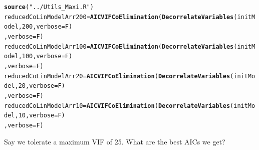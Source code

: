 \documentclass[a4paper]{article}\usepackage[]{graphicx}\usepackage[]{color}
\makeatletter
\newcommand{\hlnum}[1]{\textcolor[rgb]{0.686,0.059,0.569}{#1}}%
\newcommand{\hlstr}[1]{\textcolor[rgb]{0.192,0.494,0.8}{#1}}%
\newcommand{\hlstd}[1]{\textcolor[rgb]{0.345,0.345,0.345}{#1}}%
\newcommand{\hlkwb}[1]{\textcolor[rgb]{0.69,0.353,0.396}{#1}}%
\newcommand{\hlkwc}[1]{\textcolor[rgb]{0.333,0.667,0.333}{#1}}%
\newcommand{\hlkwd}[1]{\textcolor[rgb]{0.737,0.353,0.396}{\textbf{#1}}}%
\newenvironment{kframe}{%
 \def\at@end@of@kframe{}%
 \ifinner\ifhmode%
  \def\at@end@of@kframe{\end{minipage}}%
  \begin{minipage}{\columnwidth}%
 \fi\fi%
 \def\FrameCommand##1{\hskip\@totalleftmargin \hskip-\fboxsep
 \colorbox{shadecolor}{##1}\hskip-\fboxsep
     \hskip-\linewidth \hskip-\@totalleftmargin \hskip\columnwidth}%
 \MakeFramed {\advance\hsize-\width
   \@totalleftmargin\z@ \linewidth\hsize
   \@setminipage}}%
 {\par\unskip\endMakeFramed%
 \at@end@of@kframe}
\newenvironment{knitrout}{}{} %
\makeatother
\begin{document}
\begin{knitrout}
\color{fgcolor}\begin{kframe}
\begin{alltt}
\hlkwd{source}\hlstd{(}\hlstr{"../Utils_Maxi.R"}\hlstd{)}
\hlstd{reducedCoLinModelArr200} \hlkwb{=} \hlkwd{AICVIFCoElimination}\hlstd{(}\hlkwd{DecorrelateVariables}\hlstd{(initModel,}\hlnum{200}\hlstd{,}\hlkwc{verbose}\hlstd{=F)}
                                              \hlstd{,}\hlkwc{verbose}\hlstd{=F)}
\hlstd{reducedCoLinModelArr100} \hlkwb{=} \hlkwd{AICVIFCoElimination}\hlstd{(}\hlkwd{DecorrelateVariables}\hlstd{(initModel,}\hlnum{100}\hlstd{,}\hlkwc{verbose}\hlstd{=F)}
                                              \hlstd{,}\hlkwc{verbose}\hlstd{=F)}
\hlstd{reducedCoLinModelArr20} \hlkwb{=} \hlkwd{AICVIFCoElimination}\hlstd{(}\hlkwd{DecorrelateVariables}\hlstd{(initModel,}\hlnum{20}\hlstd{,}\hlkwc{verbose}\hlstd{=F)}
                                             \hlstd{,}\hlkwc{verbose}\hlstd{=F)}
\hlstd{reducedCoLinModelArr10} \hlkwb{=} \hlkwd{AICVIFCoElimination}\hlstd{(}\hlkwd{DecorrelateVariables}\hlstd{(initModel,}\hlnum{10}\hlstd{,}\hlkwc{verbose}\hlstd{=F)}
                                             \hlstd{,}\hlkwc{verbose}\hlstd{=F)}
\end{alltt}
\end{kframe}
\end{knitrout}

Say we tolerate a maximum VIF of 25. What are the best AICs we get?
\end{document}
